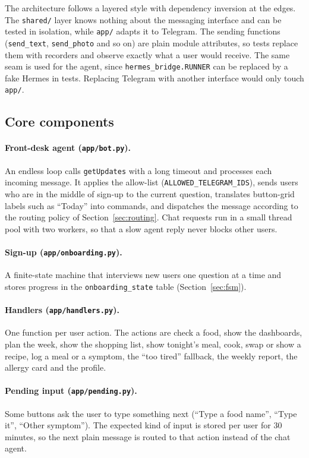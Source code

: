 \documentclass[11pt,a4paper]{article}
\begin{document}
The architecture follows a layered style with dependency inversion at the edges. The \texttt{shared/}
layer knows nothing about the messaging interface and can be tested in isolation, while \texttt{app/}
adapts it to Telegram. The sending functions (\texttt{send\_text}, \texttt{send\_photo} and so on) are
plain module attributes, so tests replace them with recorders and observe exactly what a user would
receive. The same seam is used for the agent, since \texttt{hermes\_bridge.RUNNER} can be replaced by a
fake Hermes in tests. Replacing Telegram with another interface would only touch \texttt{app/}.

\subsection{Core components}

\paragraph{Front-desk agent (\texttt{app/bot.py}).} An endless loop calls \texttt{getUpdates} with a
long timeout and processes each incoming message. It applies the allow-list
(\texttt{ALLOWED\_TELEGRAM\_IDS}), sends users who are in the middle of sign-up to the current
question, translates button-grid labels such as ``Today'' into commands, and dispatches the message
according to the routing policy of Section~\ref{sec:routing}. Chat requests run in a small thread pool
with two workers, so that a slow agent reply never blocks other users.

\paragraph{Sign-up (\texttt{app/onboarding.py}).} A finite-state machine that interviews new users one
question at a time and stores progress in the \texttt{onboarding\_state} table
(Section~\ref{sec:fsm}).

\paragraph{Handlers (\texttt{app/handlers.py}).} One function per user action. The actions are check a
food, show the dashboards, plan the week, show the shopping list, show tonight's meal, cook, swap or show
a recipe, log a meal or a symptom, the ``too tired'' fallback, the weekly report, the allergy card and
the profile.

\paragraph{Pending input (\texttt{app/pending.py}).} Some buttons ask the user to type something next
(``Type a food name'', ``Type it'', ``Other symptom''). The expected kind of input is stored per user
for 30 minutes, so the next plain message is routed to that action instead of the chat agent.
\end{document}
